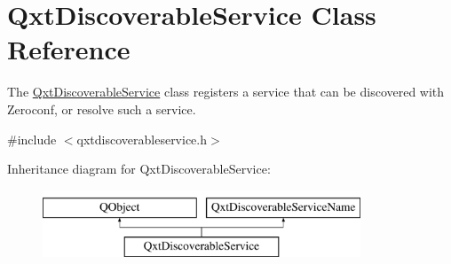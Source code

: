 \hypertarget{class_qxt_discoverable_service}{\section{Qxt\-Discoverable\-Service Class Reference}
\label{class_qxt_discoverable_service}
}


The \hyperlink{class_qxt_discoverable_service}{Qxt\-Discoverable\-Service} class registers a service that can be discovered with Zeroconf, or resolve such a service.  




{\ttfamily \#include $<$qxtdiscoverableservice.\-h$>$}

Inheritance diagram for Qxt\-Discoverable\-Service\-:\begin{figure}[H]
\begin{center}
\leavevmode
\includegraphics[height=2.000000cm]{class_qxt_discoverable_service}
\end{center}
\end{figure}
